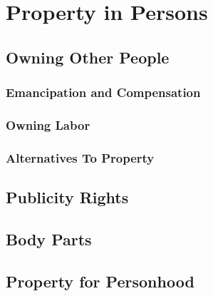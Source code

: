 \chapter{Property in Persons}



\section{Owning Other People}



\begin{questions}

\end{questions}

\subsection{Emancipation and Compensation}





\subsection{Owning Labor}



\subsection{Alternatives To Property}







\section{Publicity Rights}






\begin{questions}

\end{questions}




\section{Body Parts}






\begin{questions}

\end{questions}




\section{Property for Personhood}


